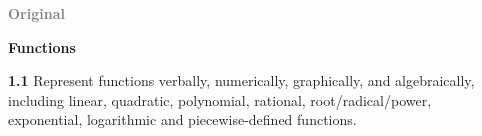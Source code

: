 \documentclass[14pt]{beamer}
\newcounter{a}
\newcounter{b}
\begin{document}
\begin{frame}

  \begin{columns}
    \begin{column}{0.495\textwidth}
      \begin{center}\large\textcolor{gray}{\textbf{Original}}\end{center}

      \textbf{Functions}

      \textbf{1.1} Represent functions verbally, numerically, graphically, and algebraically, including linear, quadratic, polynomial, rational, root/radical/power, exponential, logarithmic and piecewise-defined functions.      
    \end{column}

    \begin{column}{0.01\textwidth}
      \rule{0.01\textwidth}{\textheight}
    \end{column}
  \end{columns}



\end{frame}
\end{document}
